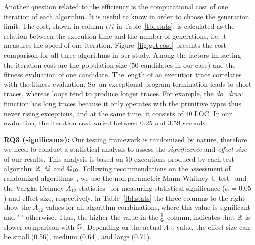 Another question related to the efficiency is the computational cost of one iteration of each algorithm. It is useful to know in order to choose the generation limit. The cost, shown in column $t/i$ in Table~\ref{tbl.stats}, is calculated as the relation between the execution time and the number of generations, i.e. it measures the speed of one iteration. Figure~\ref{fig.get.cost} presents the cost comparison for all three algorithms in our study. Among the factors impacting the iteration cost are the population size (50 candidates in our case) and the fitness evaluation of one candidate. The length of an execution trace correlates with the fitness evaluation. So, an exceptional program termination leads to short traces, whereas loops tend to produce longer traces. For example, the \emph{do_draw} function has long traces because it only operates with the primitive types thus never rising exceptions, and at the same time, it consists of 40 LOC. In our evaluation, the iteration cost varied between 0.25 and 3.59 seconds.\\

\textbf{RQ3 (significance):} Our testing framework is randomized by nature, therefore we need to conduct a statistical analysis to assess the \emph{significance} and \emph{effect size} of our results. This analysis is based on 50 executions produced by each test algorithm $\mathbb{R}$, $\mathbb{G}$ and $\mathbb{G}_{10}$. Following recommendations on the assessment of randomized algorithms~\cite{arcuri2011practical}, we use the non-parametric Mann-Whitney U-test~\cite{mann1947test} and the Vargha-Delaney $\hat{A}_{12}$ statistics~\cite{vargha2000critique} for measuring statistical significance ($\alpha=0.05$) and effect size, respectively. In Table~\ref{tbl.stats} the three columns to the right show the $\hat{A}_{12}$ values for all algorithm combinations, where this value is significant and '-' otherwise. Thus, the higher the value in the $_{\mathbb{G}}^{\mathbb{R}}$ column, indicates that $\mathbb{R}$ is slower comparison with $\mathbb{G}$. Depending on the actual $\hat{A}_{12}$ value, the effect size can be small (0.56), medium (0.64), and large (0.71).\\

